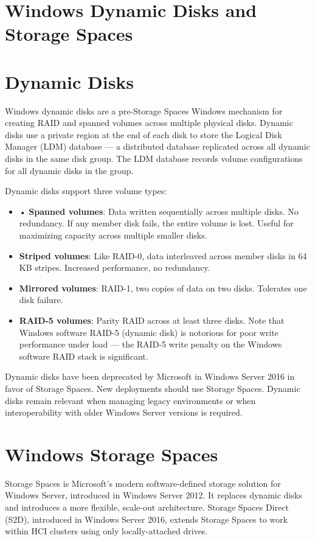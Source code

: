 \section{Windows Dynamic Disks and Storage Spaces}
\section{Dynamic Disks}
Windows dynamic disks are a pre-Storage Spaces Windows mechanism for creating RAID and spanned volumes across multiple physical disks. Dynamic disks use a private region at the end of each disk to store the Logical Disk Manager (LDM) database --- a distributed database replicated across all dynamic disks in the same disk group. The LDM database records volume configurations for all dynamic disks in the group.

Dynamic disks support three volume types:

\begin{itemize}
  \item • \textbf{Spanned volumes}: Data written sequentially across multiple disks. No redundancy. If any member disk fails, the entire volume is lost. Useful for maximizing capacity across multiple smaller disks.
  \item \textbf{Striped volumes}: Like RAID-0, data interleaved across member disks in 64 KB stripes. Increased performance, no redundancy.
  \item \textbf{Mirrored volumes}: RAID-1, two copies of data on two disks. Tolerates one disk failure.
  \item \textbf{RAID-5 volumes}: Parity RAID across at least three disks. Note that Windows software RAID-5 (dynamic disk) is notorious for poor write performance under load --- the RAID-5 write penalty on the Windows software RAID stack is significant.
\end{itemize}

Dynamic disks have been deprecated by Microsoft in Windows Server 2016 in favor of Storage Spaces. New deployments should use Storage Spaces. Dynamic disks remain relevant when managing legacy environments or when interoperability with older Windows Server versions is required.

\section{Windows Storage Spaces}
Storage Spaces is Microsoft's modern software-defined storage solution for Windows Server, introduced in Windows Server 2012. It replaces dynamic disks and introduces a more flexible, scale-out architecture. Storage Spaces Direct (S2D), introduced in Windows Server 2016, extends Storage Spaces to work within HCI clusters using only locally-attached drives.

